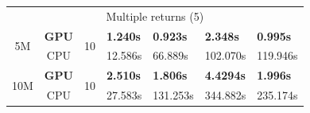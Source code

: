\begin{table}
\begin{tabular}{c|c|c|llll}
    \cmidrule{1-7}
    \multicolumn{7}{c}{Multiple returns (5)}\\
    \cmidrule{1-7}
    \multirow{2}{*}{5M} & \textbf{GPU} & \multirow{2}{*}{10} & 
    \textbf{1.240s} & \textbf{0.923s} & \textbf{2.348s} & \textbf{0.995s}\\ 
    & CPU & & 
    12.586s & 66.889s & 102.070s & 119.946s\\
    \cmidrule{1-7}
    \multirow{2}{*}{10M} & \textbf{GPU} & \multirow{2}{*}{10} & 
    \textbf{2.510s} & \textbf{1.806s} & \textbf{4.4294s} & \textbf{1.996s}\\ 
    & CPU & & 
    27.583s & 131.253s & 344.882s & 235.174s\\
    \bottomrule
    \end{tabular}
    \libertineNormal
\end{table}
\renewcommand{\arraystretch}{1}